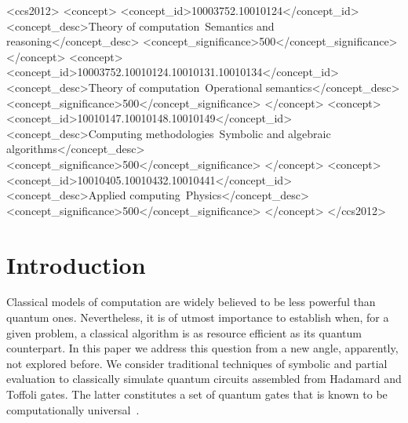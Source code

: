 \documentclass[sigplan,screen]{acmart}
\theoremstyle{definition}
\begin{document}
\begin{CCSXML}
<ccs2012>
   <concept>
       <concept_id>10003752.10010124</concept_id>
       <concept_desc>Theory of computation~Semantics and reasoning</concept_desc>
       <concept_significance>500</concept_significance>
       </concept>
   <concept>
       <concept_id>10003752.10010124.10010131.10010134</concept_id>
       <concept_desc>Theory of computation~Operational semantics</concept_desc>
       <concept_significance>500</concept_significance>
       </concept>
   <concept>
       <concept_id>10010147.10010148.10010149</concept_id>
       <concept_desc>Computing methodologies~Symbolic and algebraic algorithms</concept_desc>
       <concept_significance>500</concept_significance>
       </concept>
   <concept>
       <concept_id>10010405.10010432.10010441</concept_id>
       <concept_desc>Applied computing~Physics</concept_desc>
       <concept_significance>500</concept_significance>
       </concept>
 </ccs2012>
\end{CCSXML}



\maketitle

\section{Introduction}

Classical models of computation are widely believed to be
less powerful than quantum ones. Nevertheless, it is of utmost
importance to establish when, for a given problem,  a classical
algorithm is as resource efficient as its quantum counterpart.
In this paper we address this question from a new angle, apparently,
not explored before. We consider traditional techniques of
symbolic and partial evaluation to classically simulate quantum
circuits assembled from Hadamard and Toffoli gates. The latter
constitutes a set of quantum gates that is known to be
computationally universal~\cite{aharonov:toffolihadamard}.
\end{document}
